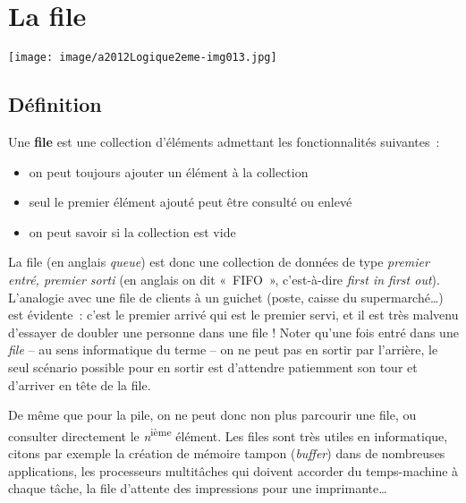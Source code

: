 \chapter{La file}

\begin{center}
	\texttt{[image: image/a2012Logique2eme-img013.jpg]}
\end{center}
	

\section{Définition}
	
	Une \textbf{file} est une collection d'éléments 
	admettant les fonctionnalités suivantes~:

	\begin{itemize}
		\item {
			on peut toujours ajouter un élément à la collection}
		\item {
			seul le premier élément ajouté peut être consulté ou enlevé}
		\item {
			on peut savoir si la collection est vide}
	\end{itemize}

	La file (en anglais \textit{queue}) est donc une collection 
	de données de type \textit{premier entré, premier sorti} 
	(en anglais on dit «~FIFO~», c'est-à-dire \textit{first in first out}). 
	L'analogie avec une file de clients à un guichet (poste, caisse du 
	supermarché{\dots}) est évidente~: c'est le premier arrivé qui est 
	le premier servi, et il est très malvenu d'essayer de doubler une personne 
	dans une file ! Noter qu'une fois entré dans une \textit{file} -- au
	sens informatique du terme -- on ne peut pas en sortir par l'arrière, 
	le seul scénario possible pour en sortir est
	d'attendre patiemment son tour et d'arriver en tête de la file.

	De même que pour la pile, on ne peut donc non plus parcourir une 
	file, ou consulter directement le \textit{n}\textsuperscript{ième}
	élément. Les files sont très utiles en informatique, citons par 
	exemple la création de mémoire tampon (\textit{buffer})
	dans de nombreuses applications, les processeurs multitâches 
	qui doivent accorder du temps-machine à chaque tâche, la
	file d'attente des impressions pour une imprimante{\dots}

